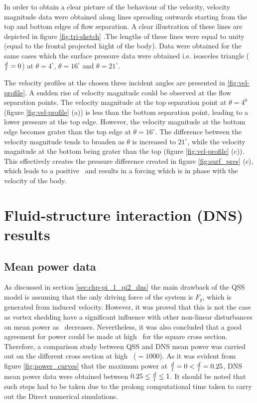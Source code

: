 In order to obtain a clear picture of the behaviour of the velocity, velocity magnitude data were obtained along lines spreading outwards starting from the top and bottom edges of flow separation. A clear illustration of these lines are depicted in figure \ref{fig:tri-sketch} .The lengths of these lines were equal to unity (equal to the frontal projected hight of the body). Data were obtained for the same cases which the surface pressure data were obtained i.e. isosceles triangle ($\frac{d}{l}=0$) at $\theta=4^{\circ}$, $\theta=16^{\circ}$ and $\theta=21^{\circ}$.



The velocity profiles at the chosen three incident angles are presented in \ref{fig:vel-profile}. A sudden rise of velocity magnitude could be observed at the flow separation points. The velocity magnitude at the top separation point  at $\theta= 4^{0}$ (figure \ref{fig:vel-profile} (a)) is less than the bottom separation point, leading to a lower pressure at the top edge. However, the velocity magnitude at the bottom edge becomes grater than the top edge at $\theta=16^{\circ}$. The difference between the velocity magnitude tends to broaden as $\theta$ is increased to $21^{\circ}$, while the velocity magnitude at the bottom being grater than the top (figure \ref{fig:vel-profile} (c)). This effectively creates the pressure difference created in figure \ref{fig:surf_pres} (c), which leads to a positive \cy\ and results in a forcing which is in phase with the velocity of the body.  


\section{Fluid-structure interaction (DNS) results}
\label{sec:cross-sec-FSI-results}

\subsection{Mean power data}
\label{subsec:cross-sec-dns-mean-power}

As discussed in section \ref{sec:chp-pi_1_pi2_dns} the main drawback of the QSS model is assuming that the only driving force of the system is $F_{y}$, which is generated from induced velocity. However, it was proved that this is not the case as vortex shedding have a significant influence with other non-linear disturbances on mean power as \massstiff\ decreases. Nevertheless, it was also concluded that a good agreement for power could be made at high \massstiff\ for the square cross section. Therefore, a comparison study between QSS and DNS mean power was carried out on the different cross section at high \massstiff\ ($=1000$). As it was evident from figure \ref{fig:power_curves} that the maximum power at $\frac{d}{l}=0 < \frac{d}{l}=0.25$, DNS mean power data were obtained between $0.25\leq\frac{d}{l}\leq1$. It should be noted that such steps had to be taken due to the prolong computational time taken to carry out the Direct numerical simulations.  

